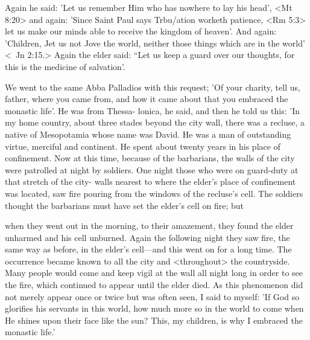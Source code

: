 Again he said: 'Let us remember Him who has nowhere to lay
his head', <Mt 8:20> and again: 'Since Saint Paul says Trbu/ation
worketh patience, <Rm 5:3> let us make our minds able to receive
the kingdom of heaven'.
And again: 'Children, Jet us not Jove the
world, neither those things which are in the world' <\ Jn 2:15.>
Again the elder said: “Let us keep a guard over our thoughts, for
this is the medicine of salvation'.

We went to the same Abba Palladios with this request; 'Of your
charity, tell us, father, where you came from, and how it came
about that you embraced the monastic life'.
He was from Thessa-
lonica, he said, and then he told us this: 'In my home country,
about three stades beyond the city wall, there was a recluse, a native
of Mesopotamia whose name was David.
He was a man of
outstanding virtue, merciful and continent.
He spent about twenty
years in his place of confinement.
Now at this time, because of the
barbarians, the walls of the city were patrolled at night by soldiers.
One night those who were on guard-duty at that stretch of the city-
walls nearest to where the elder's place of confinement was located,
saw fire pouring from the windows of the recluse's cell.
The soldiers
thought the barbarians must have set the elder's cell on fire; but

when they went out in the morning, to their amazement, they found
the elder unharmed and his cell unburned.
Again the following night
they saw fire, the same way as before, in the elder's cell—and this
went on for a long time.
The occurrence became known to all the
city and <throughout> the countryside.
Many people would come
and keep vigil at the wall all night long in order to see the fire,
which continued to appear until the elder died.
As this phenomenon
did not merely appear once or twice but was often seen, I said to
myself: 'If God so glorifies his servants in this world, how much
more so in the world to come when He shines upon their face like
the sun? This, my children, is why I embraced the monastic life.'

